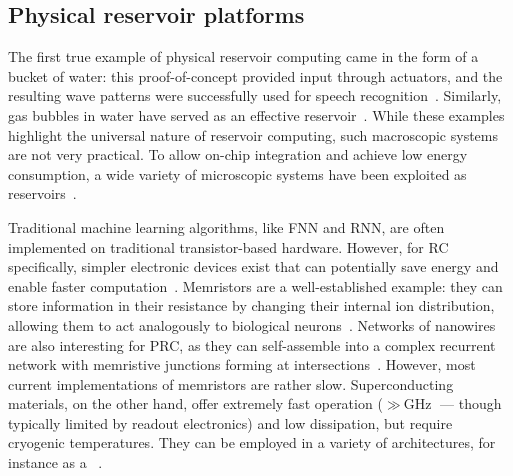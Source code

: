 \subsection{Physical reservoir platforms}\label{sec:1:PhysicalRCplatforms}
The first true example of physical reservoir computing came in the form of a bucket of water: this proof-of-concept provided input through actuators, and the resulting wave patterns were successfully used for speech recognition~\cite{PatternRecognition_Bucket}.
Similarly, gas bubbles in water have served as an effective reservoir~\cite{RC_GasBubbles}.
While these examples highlight the universal nature of reservoir computing, such macroscopic systems are not very practical.
To allow on-chip integration and achieve low energy consumption, a wide variety of microscopic systems have been exploited as reservoirs~\cite{RC_RecentAdvances}. \par
Traditional machine learning algorithms, like FNN and RNN, are often implemented on traditional transistor-based hardware.
However, for RC specifically, simpler electronic devices exist that can potentially save energy and enable faster computation~\cite{RC_RecentAdvances}.
Memristors are a well-established example: they can store information in their resistance by changing their internal ion distribution, allowing them to act analogously to biological neurons~\cite{MemristorArtificialNeuron,MemristiveNN,RC_DiffusiveMemristors,RC_MemristorTemporal}.
Networks of nanowires are also interesting for PRC, as they can self-assemble into a complex recurrent network with memristive junctions forming at intersections~\cite{RC_NNN}.
However, most current implementations of memristors are rather slow.
Superconducting materials, on the other hand, offer extremely fast operation ($\gg \SI{}{\giga\hertz}$ --- though typically limited by readout electronics) and low dissipation, but require cryogenic temperatures.
They can be employed in a variety of architectures, for instance as a ~\cite{RC_SuperconductingElectronics}. \par %
